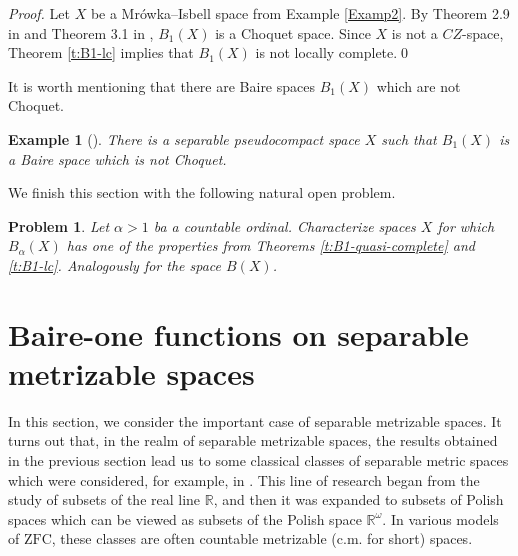 \documentclass[preprint,11pt]{elsarticle}
\newtheorem{example}[theorem]{Example}
\newtheorem{problem}[theorem]{Problem}
\numberwithin{equation}{section}
\numberwithin{theorem}{section}
\newcommand{\w}{\omega}
\newcommand{\IR}{\mathbb{R}}
\def\cm/{{c.m.}}
\begin{document}
\begin{proof}
Let $X$ be a Mr\'{o}wka--Isbell space from Example \ref{Examp2}. By Theorem 2.9  in \cite{KKL} and Theorem 3.1 in \cite{Osipov-25}, $B_1(X)$ is a Choquet space. Since $X$ is not a $CZ$-space, Theorem \ref{t:B1-lc} implies that  $B_1(X)$ is not locally complete.\qed
\end{proof}

It is worth mentioning that there are Baire  spaces $B_1(X)$ which are not Choquet.
\begin{example}[{\cite[Corollary 4.6]{Osipov-25}}]\label{exa:B1-Baire-not-Choquet}
There is a separable pseudocompact space $X$ such that $B_1(X)$ is a Baire  space which is not Choquet.
\end{example}



We finish this section with the following natural open problem.

\begin{problem}
Let $\alpha>1$ ba a countable ordinal. Characterize spaces $X$ for which $B_\alpha(X)$ has one of the properties from Theorems \ref{t:B1-quasi-complete} and \ref{t:B1-lc}. Analogously for the space $B(X)$.
\end{problem}





\section{Baire-one functions on separable metrizable spaces} %
\label{sec:B1-sms}




In this section, we consider the important case of separable  metrizable spaces. It turns out that, in the realm of separable metrizable spaces, the results obtained in the previous section lead us to some classical classes of separable metric spaces  which were considered, for example, in \cite{Miller,Bukovsky2011}. This line of research  began from the study of subsets of the real line $\IR$, and  then it was expanded to subsets of Polish spaces which can be viewed as subsets of the Polish space $\IR^\w$.
In various models of $\mathrm{ZFC}$, these classes are  often countable metrizable (\cm/ for short) spaces.
\end{document}
